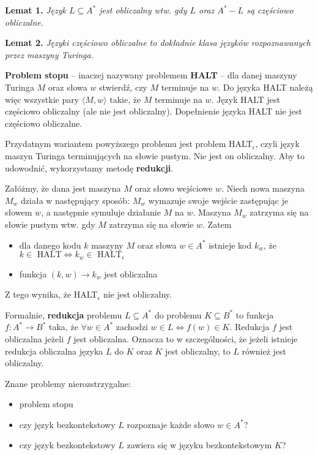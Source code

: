 \textbf{Lemat 1.} {\it Język $L \subseteq A^*$ jest obliczalny wtw. gdy $L$ oraz $A^* - L$ są częściowo obliczalne.}

\textbf{Lemat 2.} {\it Języki częściowo obliczalne to dokładnie klasa języków rozpoznawanych przez maszyny Turinga.}

\textbf{Problem stopu} -- inaczej nazywany problemem \textbf{HALT} -- dla danej maszyny Turinga $M$ oraz słowa $w$ stwierdź, czy $M$ terminuje na $w$. Do języka HALT należą więc wszystkie pary $\langle M, w \rangle$ takie, że $M$ terminuje na $w$. Język HALT jest częściowo obliczalny (ale nie jest obliczalny). Dopełnienie języka HALT nie jest częściowo obliczalne.

Przydatnym wariantem powyższego problemu jest problem HALT$_\epsilon$, czyli język maszyn Turinga terminujących na słowie pustym. Nie jest on obliczalny. Aby to udowodnić, wykorzystamy metodę \textbf{redukcji}.

\begin{example}
    Załóżmy, że dana jest maszyna $M$ oraz słowo wejściowe $w$. Niech nowa maszyna $M_w$ działa w następujący sposób: $M_w$ wymazuje swoje wejście zastępując je słowem $w$, a następnie symuluje działanie $M$ na $w$. Maszyna $M_w$ zatrzyma się na słowie pustym wtw. gdy $M$ zatrzyma się na słowie $w$. Zatem
    \begin{itemize}
        \item dla danego kodu $k$ maszyny $M$ oraz słowa $w \in A^*$ istnieje kod $k_w$, że $k \in \text{ HALT} \Leftrightarrow k_w \in \text{ HALT}_\epsilon$
        \item funkcja $(k, w) \to k_w$ jest obliczalna
    \end{itemize}
    Z tego wynika, że HALT$_\epsilon$ nie jest obliczalny.
\end{example}

Formalnie, \textbf{redukcja} problemu $L \subseteq A^*$ do problemu $K \subseteq B^*$ to funkcja $f: A^* \to B^*$ taka, że $\forall w \in A^*$ zachodzi $w \in L \Leftrightarrow f(w) \in K$. Redukcja $f$ jest obliczalna jeżeli $f$ jest obliczalna. Oznacza to w szczególności, że jeżeli istnieje redukcja obliczalna języka $L$ do $K$ oraz $K$ jest obliczalny, to $L$ również jest obliczalny.

Znane problemy nierozstrzygalne:
\begin{itemize}
    \item problem stopu
    \item czy język bezkontekstowy $L$ rozpoznaje każde słowo $w \in A^*$?
    \item czy język bezkontekstowy $L$ zawiera się w języku bezkontekstowym $K$?
\end{itemize}

